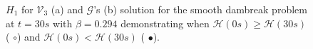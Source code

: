 \documentclass[SingleSpace,12pt,Proceedings]{Serre_ASCE}
\begin{document}
\begin{figure}
\centering
{}
\caption{$H_1$ for $\mathcal{V}_3$ (a) and $\mathcal{G}$'s (b) solution for the smooth dambreak problem at $t = 30s$ with $\beta = 0.294$ demonstrating when $\mathcal{H}(0s) \ge \mathcal{H}(30s)$ ({\color{red} $\circ$}) and $\mathcal{H}(0s) < \mathcal{H}(30s)$ ({\color{blue} $\bullet$}).}
\label{fig:o3a4dxHallsign}
\end{figure}
\end{document}
